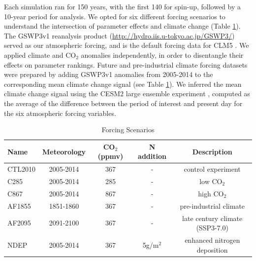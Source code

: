 \documentclass[draft]{agujournal2019}
\begin{document}
Each simulation ran for 150 years, with the first 140 for spin-up, followed by a 10-year period for analysis. We opted for six different forcing scenarios to understand the intersection of parameter effects and climate change (Table \ref{tab:exps}). The GSWP3v1 reanalysis product (\url{http://hydro.iis.u-tokyo.ac.jp/GSWP3/}) served as our atmospheric forcing, and is the default forcing data for CLM5 \cite{lawrence2019}. We applied climate and CO$_2$ anomalies independently, in order to disentangle their effects on parameter rankings. Future and pre-industrial climate forcing datasets were prepared by adding GSWP3v1 anomalies from 2005-2014 to the corresponding mean climate change signal (see Table \ref{tab:exps}). We inferred the mean climate change signal using the CESM2 large ensemble experiment \cite{rodgers2021}, computed as the average of the difference between the period of interest and present day for the six atmospheric forcing variables.

\label{sect:exps}
 \begin{table}[h]
 \caption{Forcing Scenarios}
 \centering
 \begin{tabular}{l c c c c}
 \hline
  Name  & Meteorology & CO$_2$ (ppmv) & N addition & Description \\
 \hline
   CTL2010  & 2005-2014 & 367 & - & control experiment\\
   C285        & 2005-2014 & 285 & - & low CO$_2$ \\
   C867        & 2005-2014 & 867 & - & high CO$_2$ \\
   AF1855    & 1851-1860 & 367 & - & pre-industrial climate \\
   AF2095    & 2091-2100 & 367 & - & late century climate (SSP3-7.0) \\
   NDEP      & 2005-2014 & 367 & 5g/m$^2$ & enhanced nitrogen deposition \\
 \hline
 \end{tabular}
 \label{tab:exps}
 \end{table}
\end{document}
